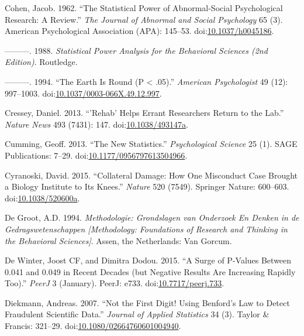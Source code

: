 \documentclass[a5paper]{book}
\begin{document}
\hypertarget{ref-doi:10.1037ux2fh0045186}{}
Cohen, Jacob. 1962. ``The Statistical Power of Abnormal-Social
Psychological Research: A Review.'' \emph{The Journal of Abnormal and
Social Psychology} 65 (3). American Psychological Association (APA):
145--53. doi:\href{https://doi.org/10.1037/h0045186}{10.1037/h0045186}.

\hypertarget{ref-isbn:9780805802832}{}
---------. 1988. \emph{Statistical Power Analysis for the Behavioral
Sciences (2nd Edition)}. Routledge.

\hypertarget{ref-doi:10.1037ux2f0003-066X.49.12.997}{}
---------. 1994. ``The Earth Is Round (P \textless{} .05).''
\emph{American Psychologist} 49 (12): 997--1003.
doi:\href{https://doi.org/10.1037/0003-066X.49.12.997}{10.1037/0003-066X.49.12.997}.

\hypertarget{ref-doi:10.1038ux2f493147a}{}
Cressey, Daniel. 2013. ``'Rehab' Helps Errant Researchers Return to the
Lab.'' \emph{Nature News} 493 (7431): 147.
doi:\href{https://doi.org/10.1038/493147a}{10.1038/493147a}.

\hypertarget{ref-doi:10.1177ux2f0956797613504966}{}
Cumming, Geoff. 2013. ``The New Statistics.'' \emph{Psychological
Science} 25 (1). SAGE Publications: 7--29.
doi:\href{https://doi.org/10.1177/0956797613504966}{10.1177/0956797613504966}.

\hypertarget{ref-doi:10.1038ux2f520600a}{}
Cyranoski, David. 2015. ``Collateral Damage: How One Misconduct Case
Brought a Biology Institute to Its Knees.'' \emph{Nature} 520 (7549).
Springer Nature: 600--603.
doi:\href{https://doi.org/10.1038/520600a}{10.1038/520600a}.

\hypertarget{ref-isbn:9789023228912}{}
De Groot, A.D. 1994. \emph{Methodologie: Grondslagen van Onderzoek En
Denken in de Gedragswetenschappen {[}Methodology: Foundations of
Research and Thinking in the Behavioral Sciences{]}}. Assen, the
Netherlands: Van Gorcum.

\hypertarget{ref-doi:10.7717ux2fpeerj.733}{}
De Winter, Joost CF, and Dimitra Dodou. 2015. ``A Surge of P-Values
Between 0.041 and 0.049 in Recent Decades (but Negative Results Are
Increasing Rapidly Too).'' \emph{PeerJ} 3 (January). PeerJ: e733.
doi:\href{https://doi.org/10.7717/peerj.733}{10.7717/peerj.733}.

\hypertarget{ref-doi:10.1080ux2f02664760601004940}{}
Diekmann, Andreas. 2007. ``Not the First Digit! Using Benford's Law to
Detect Fraudulent Scientific Data.'' \emph{Journal of Applied
Statistics} 34 (3). Taylor \& Francis: 321--29.
doi:\href{https://doi.org/10.1080/02664760601004940}{10.1080/02664760601004940}.
\end{document}
